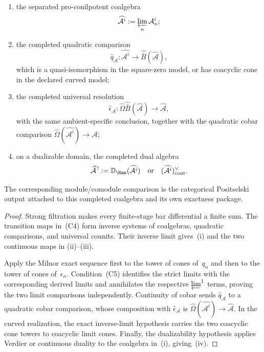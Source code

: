 \begin{theorem}
\begin{enumerate}[label=\textup{(\roman*)}]
\item the separated pro-conilpotent coalgebra
 \[
  \widehat{\mathcal A^i}:=\varprojlim_n\mathcal A_n^i;
 \]
\item the completed quadratic comparison
 \[
  \widehat q_{\mathcal A}\colon
  \widehat{\mathcal A^i}\longrightarrow
  \widehat{\bar B}(\widehat{\mathcal A}),
 \]
 which is a quasi-isomorphism in the square-zero model, or has
 coacyclic cone in the declared curved model;
\item the completed universal resolution
 \[
  \widehat\epsilon_{\mathcal A}\colon
  \widehat\Omega\widehat{\bar B}(\widehat{\mathcal A})
  \longrightarrow\widehat{\mathcal A},
 \]
 with the same ambient-specific conclusion, together with the
 quadratic cobar comparison
 $\widehat\Omega(\widehat{\mathcal A^i})\to\widehat{\mathcal A}$;
\item on a dualizable domain, the completed dual algebra
 \[
  \widehat{\mathcal A}^{\,!}
  :=\mathbb D_{\Ran}(\widehat{\mathcal A^i})
  \quad\text{or}\quad
  (\widehat{\mathcal A^i})^\vee_{\mathrm{cont}}.
 \]
\end{enumerate}
The corresponding module/comodule comparison is the categorical
Positselski output attached to this completed coalgebra and its own
exactness package.
\end{theorem}

\begin{proof}
Strong filtration makes every finite-stage bar differential a finite
sum.  The transition maps in~\textup{(C4)} form inverse systems of
coalgebras, quadratic comparisons, and universal counits.  Their
inverse limit gives~\textup{(i)} and the two continuous maps in
\textup{(ii)}--\textup{(iii)}.

Apply the Milnor exact sequence first to the tower of cones of~$q_n$
and then to the tower of cones of~$\epsilon_n$.  Condition~\textup{(C5)}
identifies the strict limits with the corresponding derived limits and
annihilates the respective $\varprojlim^1$ terms, proving the two
limit comparisons independently.  Continuity of cobar sends
$\widehat q_{\mathcal A}$ to a quadratic cobar comparison, whose
composition with $\widehat\epsilon_{\mathcal A}$ is
$\widehat\Omega(\widehat{\mathcal A^i})\to\widehat{\mathcal A}$.
In the curved realization, the exact inverse-limit hypothesis carries
the two coacyclic cone towers to coacyclic limit cones.
Finally, the dualizability hypothesis applies Verdier or continuous
duality to the coalgebra in~\textup{(i)}, giving~\textup{(iv)}.
\end{proof}

